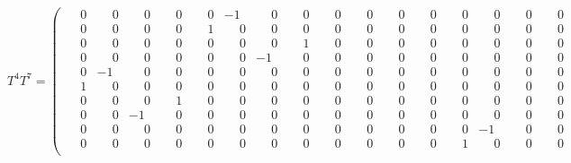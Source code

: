\documentclass[10pt]{article}
\begin{document}
\[
T^{4}T^{7} = \left(\begin{smallmatrix}
\phantom{-}0 & \phantom{-}0 & \phantom{-}0 & \phantom{-}0 & \phantom{-}0 & -1 & \phantom{-}0 & \phantom{-}0 & \phantom{-}0 & \phantom{-}0 & \phantom{-}0 & \phantom{-}0 & \phantom{-}0 & \phantom{-}0 & \phantom{-}0 & \phantom{-}0 \\
\phantom{-}0 & \phantom{-}0 & \phantom{-}0 & \phantom{-}0 & \phantom{-}1 & \phantom{-}0 & \phantom{-}0 & \phantom{-}0 & \phantom{-}0 & \phantom{-}0 & \phantom{-}0 & \phantom{-}0 & \phantom{-}0 & \phantom{-}0 & \phantom{-}0 & \phantom{-}0 \\
\phantom{-}0 & \phantom{-}0 & \phantom{-}0 & \phantom{-}0 & \phantom{-}0 & \phantom{-}0 & \phantom{-}0 & \phantom{-}1 & \phantom{-}0 & \phantom{-}0 & \phantom{-}0 & \phantom{-}0 & \phantom{-}0 & \phantom{-}0 & \phantom{-}0 & \phantom{-}0 \\
\phantom{-}0 & \phantom{-}0 & \phantom{-}0 & \phantom{-}0 & \phantom{-}0 & \phantom{-}0 & -1 & \phantom{-}0 & \phantom{-}0 & \phantom{-}0 & \phantom{-}0 & \phantom{-}0 & \phantom{-}0 & \phantom{-}0 & \phantom{-}0 & \phantom{-}0 \\
\phantom{-}0 & -1 & \phantom{-}0 & \phantom{-}0 & \phantom{-}0 & \phantom{-}0 & \phantom{-}0 & \phantom{-}0 & \phantom{-}0 & \phantom{-}0 & \phantom{-}0 & \phantom{-}0 & \phantom{-}0 & \phantom{-}0 & \phantom{-}0 & \phantom{-}0 \\
\phantom{-}1 & \phantom{-}0 & \phantom{-}0 & \phantom{-}0 & \phantom{-}0 & \phantom{-}0 & \phantom{-}0 & \phantom{-}0 & \phantom{-}0 & \phantom{-}0 & \phantom{-}0 & \phantom{-}0 & \phantom{-}0 & \phantom{-}0 & \phantom{-}0 & \phantom{-}0 \\
\phantom{-}0 & \phantom{-}0 & \phantom{-}0 & \phantom{-}1 & \phantom{-}0 & \phantom{-}0 & \phantom{-}0 & \phantom{-}0 & \phantom{-}0 & \phantom{-}0 & \phantom{-}0 & \phantom{-}0 & \phantom{-}0 & \phantom{-}0 & \phantom{-}0 & \phantom{-}0 \\
\phantom{-}0 & \phantom{-}0 & -1 & \phantom{-}0 & \phantom{-}0 & \phantom{-}0 & \phantom{-}0 & \phantom{-}0 & \phantom{-}0 & \phantom{-}0 & \phantom{-}0 & \phantom{-}0 & \phantom{-}0 & \phantom{-}0 & \phantom{-}0 & \phantom{-}0 \\
\phantom{-}0 & \phantom{-}0 & \phantom{-}0 & \phantom{-}0 & \phantom{-}0 & \phantom{-}0 & \phantom{-}0 & \phantom{-}0 & \phantom{-}0 & \phantom{-}0 & \phantom{-}0 & \phantom{-}0 & \phantom{-}0 & -1 & \phantom{-}0 & \phantom{-}0 \\
\phantom{-}0 & \phantom{-}0 & \phantom{-}0 & \phantom{-}0 & \phantom{-}0 & \phantom{-}0 & \phantom{-}0 & \phantom{-}0 & \phantom{-}0 & \phantom{-}0 & \phantom{-}0 & \phantom{-}0 & \phantom{-}1 & \phantom{-}0 & \phantom{-}0 & \phantom{-}0 \\

\end{smallmatrix}\]
\end{document}

